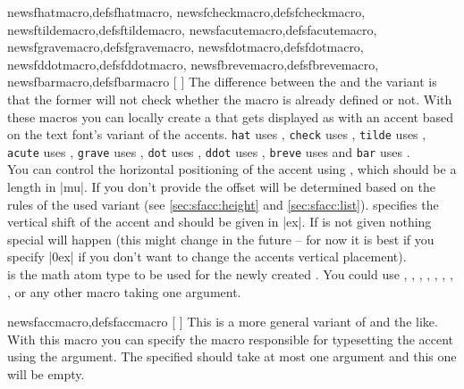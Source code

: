 \begin{describemacro}%
  {%
    newsfhatmacro,defsfhatmacro,%
    newsfcheckmacro,defsfcheckmacro,%
    newsftildemacro,defsftildemacro,%
    newsfacutemacro,defsfacutemacro,%
    newsfgravemacro,defsfgravemacro,%
    newsfdotmacro,defsfdotmacro,%
    newsfddotmacro,defsfddotmacro,%
    newsfbrevemacro,defsfbrevemacro,%
    newsfbarmacro,defsfbarmacro%
  }%
  [%
    \hspace{0pt}%
  ]
  The difference between the  and the  variant is that
  the former will not check whether the macro  is already defined or
  not. With these macros you can locally create a  that gets displayed
  as  with an accent based on the text font's variant of the
  accents.  \texttt{hat} uses \cs{^}, \texttt{check} uses , \texttt{tilde}
  uses \cs{~}, \texttt{acute} uses , \texttt{grave} uses ,
  \texttt{dot} uses , \texttt{ddot} uses , \texttt{breve} uses
   and \texttt{bar} uses \cs{=}.\\
  You can control the horizontal positioning of the accent using
  , which should be a length in |mu|. If you don't provide
   the offset will be determined based on the rules of the used
  variant (see \autoref{sec:sfacc:height} and \autoref{sec:sfacc:list}).
   specifies the vertical shift of the accent and should be given
  in |ex|. If  is not given nothing special will happen (this
  might change in the future -- for now it is best if you specify |0ex| if you
  don't want to change the accents vertical placement).\\
   is the math atom type to be used for the newly created .
  You could use , , , ,
  , , , , or any other
  macro taking one argument.
\end{describemacro}%

\begin{describemacro}{newsfaccmacro,defsfaccmacro}%
  [%
    \hspace{0pt}%
  ]
  This is a more general variant of  and the like. With this
  macro you can specify the macro responsible for typesetting the accent using
  the  argument. The specified  should take at most
  one argument and this one will be empty.
\end{describemacro}%

